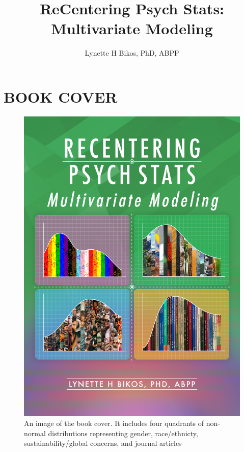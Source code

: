 \documentclass[
]{book}
\title{ReCentering Psych Stats: Multivariate Modeling}
\author{Lynette H Bikos, PhD, ABPP}
\date{}
\begin{document}
\maketitle

{
\setcounter{tocdepth}{1}
\tableofcontents
}
\hypertarget{book-cover}{%
\chapter*{BOOK COVER}\label{book-cover}}

\begin{figure}
\centering
\includegraphics{images/ReC_multivariate_bkcvr.png}
\caption{An image of the book cover. It includes four quadrants of non-normal distributions representing gender, race/ethnicty, sustainability/global concerns, and journal articles}
\end{figure}
\end{document}
